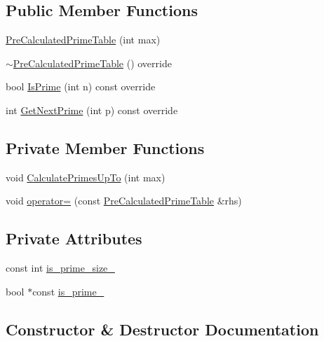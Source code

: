 \subsection*{Public Member Functions}
\begin{DoxyCompactItemize}
\item 
\hyperlink{classPreCalculatedPrimeTable_a6bb947504421e31da70d2c71576be350}{Pre\+Calculated\+Prime\+Table} (int max)
\item 
\hyperlink{classPreCalculatedPrimeTable_aeb9fb66a80367344b6ffe9c343b73464}{$\sim$\+Pre\+Calculated\+Prime\+Table} () override
\item 
bool \hyperlink{classPreCalculatedPrimeTable_a62be946777f7f98bbfc01edc0f15a4bb}{Is\+Prime} (int n) const override
\item 
int \hyperlink{classPreCalculatedPrimeTable_a0b99de0a790db9f0cc2b3cd4b527fd5a}{Get\+Next\+Prime} (int p) const override
\end{DoxyCompactItemize}
\subsection*{Private Member Functions}
\begin{DoxyCompactItemize}
\item 
void \hyperlink{classPreCalculatedPrimeTable_a393cb4947a57da9442e435eeff168b76}{Calculate\+Primes\+Up\+To} (int max)
\item 
void \hyperlink{classPreCalculatedPrimeTable_a67012c43b78cee27b891a9934becc455}{operator=} (const \hyperlink{classPreCalculatedPrimeTable}{Pre\+Calculated\+Prime\+Table} \&rhs)
\end{DoxyCompactItemize}
\subsection*{Private Attributes}
\begin{DoxyCompactItemize}
\item 
const int \hyperlink{classPreCalculatedPrimeTable_ad4275df41c5e5be3cad8c5abeaad1ac6}{is\+\_\+prime\+\_\+size\+\_\+}
\item 
bool $\ast$const \hyperlink{classPreCalculatedPrimeTable_ac393ebf41a32b3cba39fe67f7aa5fa38}{is\+\_\+prime\+\_\+}
\end{DoxyCompactItemize}


\subsection{Constructor \& Destructor Documentation}
\mbox{\label{classPreCalculatedPrimeTable_a6bb947504421e31da70d2c71576be350}} 
